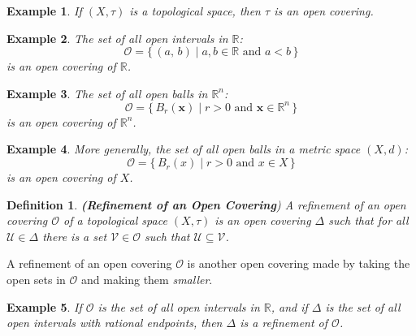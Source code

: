 \documentclass{article}
\theoremstyle{plain}
\theoremstyle{normal}
\newtheorem{definition}{Definition}[section]
\newtheorem{example}{Example}[section]
\begin{document}
        \begin{example}
            If $(X,\tau)$ is a topological space, then $\tau$ is an open
            covering.
        \end{example}
        \begin{example}
            The set of all open intervals in $\mathbb{R}$:
            \begin{equation}
                \mathcal{O}=
                    \{\,(a,\,b)\;|\;a,b\in\mathbb{R}\textrm{ and }a<b\,\}
            \end{equation}
            is an open covering of $\mathbb{R}$.
        \end{example}
        \begin{example}
            The set of all open balls in $\mathbb{R}^{n}$:
            \begin{equation}
                \mathcal{O}=
                    \{\,B_{r}(\mathbf{x})\;|\;
                        r>0\textrm{ and }\mathbf{x}\in\mathbb{R}^{n}\,\}
            \end{equation}
            is an open covering of $\mathbb{R}^{n}$.
        \end{example}
        \begin{example}
            More generally, the set of all open balls in a metric space $(X,d)$:
            \begin{equation}
                \mathcal{O}=
                    \{\,B_{r}(x)\;|\;r>0\textrm{ and }x\in{X}\,\}
            \end{equation}
            is an open covering of $X$.
        \end{example}
        \begin{definition}{\textbf{(Refinement of an Open Covering})}
            A refinement of an open covering $\mathcal{O}$ of a topological
            space $(X,\tau)$ is an open covering $\Delta$ such that for all
            $\mathcal{U}\in\Delta$ there is a set $\mathcal{V}\in\mathcal{O}$
            such that $\mathcal{U}\subseteq\mathcal{V}$.
        \end{definition}
        A refinement of an open covering $\mathcal{O}$ is another open covering
        made by taking the open sets in $\mathcal{O}$ and making them
        \textit{smaller}.
        \begin{example}
            If $\mathcal{O}$ is the set of all open intervals in $\mathbb{R}$,
            and if $\Delta$ is the set of all open intervals with rational
            endpoints, then $\Delta$ is a refinement of $\mathcal{O}$.
        \end{example}
\end{document}

